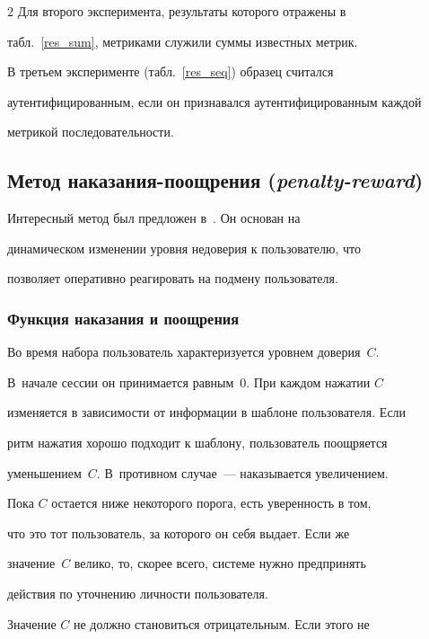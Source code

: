 \begin{multicols}{2}
Для второго эксперимента, результаты которого отражены в

табл.~\ref{res_sum}, метриками служили суммы известных метрик.



В третьем эксперименте (табл.~\ref{res_seq}) образец считался

аутентифицированным, если он признавался аутентифицированным каждой

метрикой последовательности.



\subsection{Метод наказания-поощрения (\textit{penalty-reward})}



Интересный метод был предложен в~\cite{nisk}. Он основан на

динамическом изменении уровня недоверия к пользователю, что

позволяет оперативно реагировать на подмену пользователя.



\subsubsection{Функция наказания и поощрения}



Во время набора пользователь характеризуется уровнем доверия~$C$. 

В~начале сессии он принимается равным~0. При каждом нажатии $C$

изменяется в зависимости от информации в шаблоне пользователя. Если

ритм нажатия хорошо подходит к шаб\-ло\-ну, пользователь поощряется

уменьшением~$C$. В~противном случае~--- наказывается увеличением.



Пока $C$ остается ниже некоторого порога, есть уверенность в том,

что это тот пользователь, за которого он себя выдает. Если же

значение~$C$ велико, то, скорее всего, системе нужно предпринять

действия по уточнению личности пользователя.



Значение $C$ не должно становиться отрицательным. Если этого не


\end{multicols}

